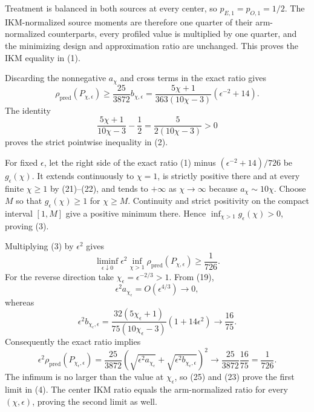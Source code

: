 Treatment is balanced in both sources at every center, so \(p_{E,1}=p_{O,1}=1/2\). The IKM-normalized source moments are therefore one quarter of their arm-normalized counterparts, every profiled value is multiplied by one quarter, and the minimizing design and approximation ratio are unchanged. This proves the IKM equality in (1).

Discarding the nonnegative \(a_\chi\) and cross terms in the exact ratio gives
\[
 \rho_{\mathrm{pred}}(P_{\chi,\epsilon})
 \ge \frac{25}{3872}b_{\chi,\epsilon}
 =\frac{5\chi+1}{363(10\chi-3)}(\epsilon^{-2}+14).     \tag{21}
\]
The identity
\[
 \frac{5\chi+1}{10\chi-3}-\frac12
 =\frac5{2(10\chi-3)}>0                                \tag{22}
\]
proves the strict pointwise inequality in (2).

For fixed \(\epsilon\), let the right side of the exact ratio (1) minus \((\epsilon^{-2}+14)/726\) be \(g_\epsilon(\chi)\). It extends continuously to \(\chi=1\), is strictly positive there and at every finite \(\chi\ge1\) by (21)--(22), and tends to \(+\infty\) as \(\chi\to\infty\) because \(a_\chi\sim10\chi\). Choose \(M\) so that \(g_\epsilon(\chi)\ge1\) for \(\chi\ge M\). Continuity and strict positivity on the compact interval \([1,M]\) give a positive minimum there. Hence \(\inf_{\chi>1}g_\epsilon(\chi)>0\), proving (3).

Multiplying (3) by \(\epsilon^2\) gives
\[
 \liminf_{\epsilon\downarrow0}\epsilon^2
 \inf_{\chi>1}\rho_{\mathrm{pred}}(P_{\chi,\epsilon})
 \ge\frac1{726}.                                      \tag{23}
\]
For the reverse direction take \(\chi_\epsilon=\epsilon^{-2/3}>1\). From (19),
\[
 \epsilon^2a_{\chi_\epsilon}=O(\epsilon^{4/3})\longrightarrow0,
\]
whereas
\[
 \epsilon^2b_{\chi_\epsilon,\epsilon}
 =\frac{32(5\chi_\epsilon+1)}{75(10\chi_\epsilon-3)}
 (1+14\epsilon^2)\longrightarrow\frac{16}{75}.         \tag{24}
\]
Consequently the exact ratio implies
\[
 \epsilon^2\rho_{\mathrm{pred}}(P_{\chi_\epsilon,\epsilon})
 =\frac{25}{3872}
 \left(\sqrt{\epsilon^2a_{\chi_\epsilon}}
 +\sqrt{\epsilon^2b_{\chi_\epsilon,\epsilon}}\right)^2
 \longrightarrow \frac{25}{3872}\frac{16}{75}
 =\frac1{726}.                                        \tag{25}
\]
The infimum is no larger than the value at \(\chi_\epsilon\), so (25) and (23) prove the first limit in (4). The center IKM ratio equals the arm-normalized ratio for every \((\chi,\epsilon)\), proving the second limit as well.